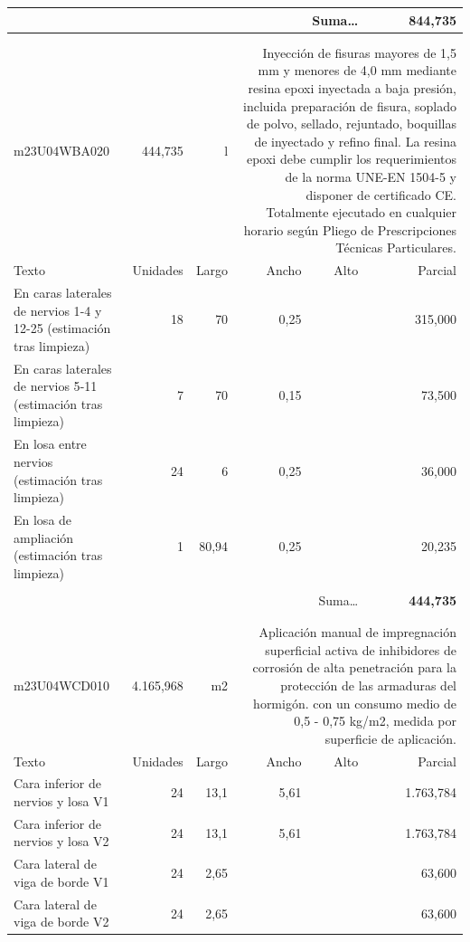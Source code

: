 \documentclass{book}%
\begin{document}
\begin{longtable}{lrrrrr}
\multicolumn{5}{r}{Suma\ldots}&\textbf{   844,735}\\%
\hline%
&&&&&\\%
&&&&&\\%
m23U04WBA020&   444,735& l&\multicolumn{3}{p{6cm}}{\scriptsize Inyección de fisuras mayores de 1,5 mm y menores de 4,0 mm mediante resina epoxi inyectada a baja presión, incluida preparación de fisura, soplado de polvo, sellado, rejuntado, boquillas de inyectado y refino final. La resina epoxi debe cumplir los requerimientos de la norma UNE-EN 1504-5 y disponer de certificado CE. Totalmente ejecutado en cualquier horario según Pliego de Prescripciones Técnicas Particulares.\normalsize}\\%
Texto&Unidades&Largo&Ancho&Alto&Parcial\\%
\hline%
\multicolumn{1}{p{3.5cm}}{En caras laterales de nervios 1{-}4 y 12{-}25 (estimación tras limpieza)}&18&70&0,25&&   315,000\\%
\multicolumn{1}{p{3.5cm}}{En caras laterales de nervios 5{-}11 (estimación tras limpieza)}&7&70&0,15&&    73,500\\%
\multicolumn{1}{p{3.5cm}}{En losa entre nervios (estimación tras limpieza)}&24&6&0,25&&    36,000\\%
\multicolumn{1}{p{3.5cm}}{En losa de ampliación (estimación tras limpieza)}&1&80,94&0,25&&    20,235\\%
&&&&&\\%
\multicolumn{5}{r}{Suma\ldots}&\textbf{   444,735}\\%
\hline%
&&&&&\\%
&&&&&\\%
m23U04WCD010& 4.165,968& m2&\multicolumn{3}{p{6cm}}{\scriptsize Aplicación manual de impregnación superficial activa de inhibidores de corrosión de alta penetración para la protección de las armaduras del hormigón. con un consumo medio de 0,5 - 0,75 kg/m2, medida por superficie de aplicación.\normalsize}\\%
Texto&Unidades&Largo&Ancho&Alto&Parcial\\%
\hline%
\multicolumn{1}{p{3.5cm}}{Cara inferior de nervios y losa V1}&24&13,1&5,61&& 1.763,784\\%
\multicolumn{1}{p{3.5cm}}{Cara inferior de nervios y losa V2}&24&13,1&5,61&& 1.763,784\\%
\multicolumn{1}{p{3.5cm}}{Cara lateral de viga de borde V1}&24&2,65&&&    63,600\\%
\multicolumn{1}{p{3.5cm}}{Cara lateral de viga de borde V2}&24&2,65&&&    63,600\\%

\end{longtable}
\end{document}
